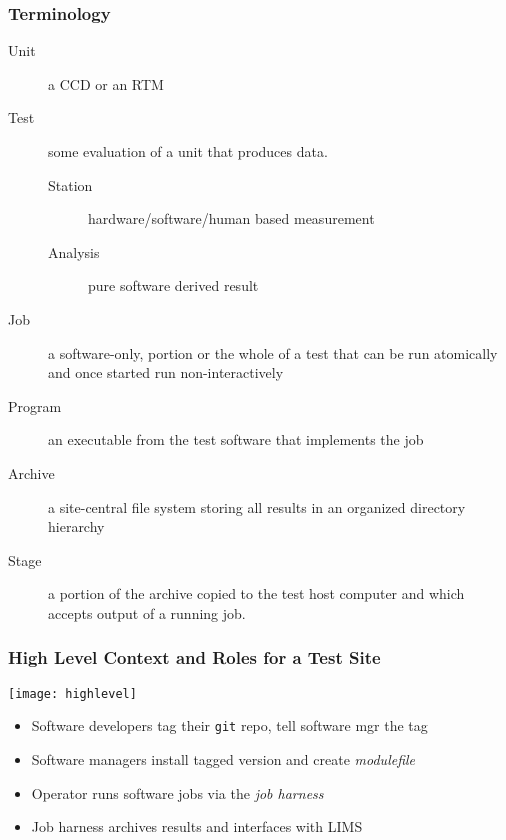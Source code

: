 \documentclass[xcolor=dvipsnames]{beamer}
\newcommand{\code}[1]{\texttt{#1}}
\begin{document}
\begin{frame}
  \frametitle{Terminology}
  \begin{description}
  \item[Unit] a CCD or an RTM
  \item[Test] some evaluation of a unit that produces data.
    \begin{description}
      \item[Station] hardware/software/human based measurement
      \item[Analysis] pure software derived result
    \end{description}
  \item[Job] a software-only, portion or the whole of a test that can
    be run atomically and once started run non-interactively
  \item[Program] an executable from the test software that implements the job
  \item[Archive] a site-central file system storing all results in an
    organized directory hierarchy
  \item[Stage] a portion of the archive copied to the test host
    computer and which accepts output of a running job.
  \end{description}
\end{frame}

\begin{frame}
  \frametitle{High Level Context and Roles for a Test Site}
  \texttt{[image: highlevel]}

  \begin{itemize}
  \item Software developers tag their \code{git} repo, tell software mgr the tag
  \item Software managers install tagged version and create \textit{modulefile}
  \item Operator runs software jobs via the \textit{job harness}
  \item Job harness archives results and interfaces with LIMS
  \end{itemize}

\end{frame}
\end{document}

